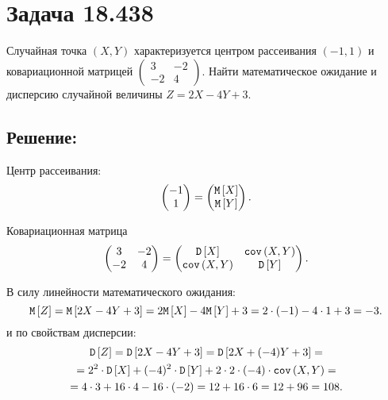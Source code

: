 \section*{Задача 18.438}

Случайная точка $\left ( X, Y \right )$ характеризуется центром рассеивания $(-1, 1)$ и ковариационной матрицей
$\begin{pmatrix}
     3  & -2 \\
     -2 & 4
\end{pmatrix}$.
Найти математическое ожидание и дисперсию случайной величины $Z = 2 X - 4 Y + 3$.

\subsection*{Решение:}

Центр рассеивания:
\begin{equation}
    \begin{pmatrix}
        -1 \\
        1
    \end{pmatrix}
    =
    \begin{pmatrix}
        \mathtt{M} \left [ X \right ] \\
        \mathtt{M} \left [ Y \right ]
    \end{pmatrix}
    .
\end{equation}

Ковариационная матрица
\begin{equation}
    \begin{pmatrix}
        3  & -2 \\
        -2 & 4
    \end{pmatrix}
    =
    \begin{pmatrix}
        \mathtt{D} \left [ X \right ]      & \texttt{cov} \left ( X , Y \right ) \\
        \texttt{cov} \left ( X , Y \right ) & \mathtt{D} \left [ Y \right ]
    \end{pmatrix}
    .
\end{equation}

В силу линейности математического ожидания:
\begin{equation}
    \mathtt{M} \left [ Z \right ]
    = \mathtt{M} \left [ 2X - 4 Y + 3 \right ]
    = 2 \mathtt{M} \left [ X \right ] - 4 \mathtt{M} \left [ Y \right ] + 3
    = 2 \cdot (-1) - 4 \cdot 1 + 3
    = -3
    .
\end{equation}
и по свойствам дисперсии:
\begin{multline}
    \mathtt{D} \left [ Z \right ]
    = \mathtt{D} \left [ 2 X - 4 Y + 3 \right ]
    = \mathtt{D} \left [ 2 X + (-4) Y + 3 \right ] = \\
    = 2^2 \cdot \mathtt{D} \left [ X \right ] + (-4)^2 \cdot \mathtt{D} \left [ Y \right ] + 2 \cdot 2 \cdot (-4) \cdot \texttt{cov} \left ( X , Y \right ) = \\
    = 4 \cdot 3 + 16 \cdot 4 - 16 \cdot (-2)
    = 12 + 16 \cdot 6
    = 12 + 96
    = 108.
\end{multline}

